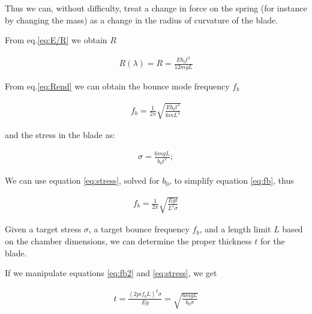 
Thus we can, without difficulty, treat a change in force on the spring (for instance by changing the mass) as a change in the radius of curvature of the blade.


From eq.\ref{eq:E/R} we obtain $R$

\begin{eqnarray}
R(\lambda) = R = \frac{E b_0 t^3}{12 m g L}
\label{eq:Rend}
\end{eqnarray}

From eq.{\ref{eq:Rend}} we can obtain the bounce mode frequency $f_b$

\begin{eqnarray}
f_b = \frac{1}{2\pi}\sqrt{\frac{E b_0 t^3}{6 m L^3}}
\label{eq:fb}
\end{eqnarray}

and the stress in the blade as:

\begin{eqnarray}
\sigma = \frac{6 m g L}{ b_0 t^2};
\label{eq:stress}
\end{eqnarray}

We can use equation \ref{eq:stress}, solved for $b_0$, to simplify equation \ref{eq:fb}, thus

\begin{eqnarray}
f_b = \frac{1}{2\pi}\sqrt{\frac{E g t}{L^2 \sigma}}
\label{eq:fb2}
\end{eqnarray}

Given a target stress $\sigma$, a target bounce frequency $f_b$, and a length limit $L$ based on the chamber dimensions, we can determine the proper thickness $t$ for the blade.

If we manipulate equations \ref{eq:fb2} and \ref{eq:stress}, we get

\begin{eqnarray}
t = \frac{(2 pi f_b L)^2 \sigma}{E g} = \sqrt{\frac{6 m g L}{ b_0 \sigma}}
\label{eq:thickness}
\end{eqnarray}

